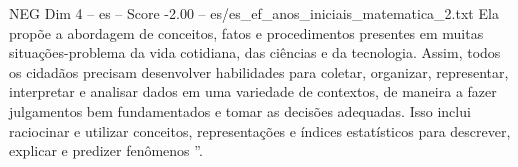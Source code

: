 \begin{textsample}{NEG Dim 4 – es – Score -2.00 – es/es\_ef\_anos\_iniciais\_matematica\_2.txt}
Ela propõe a abordagem de conceitos, fatos e procedimentos presentes em muitas situações-problema da vida cotidiana, das ciências e da tecnologia.
Assim, todos os cidadãos precisam desenvolver habilidades para coletar, organizar, representar, interpretar e analisar dados em uma variedade de contextos, de maneira a fazer julgamentos bem fundamentados e tomar as decisões adequadas.
Isso inclui raciocinar e utilizar conceitos, representações e índices estatísticos para descrever, explicar e predizer fenômenos ”.

\end{textsample}
